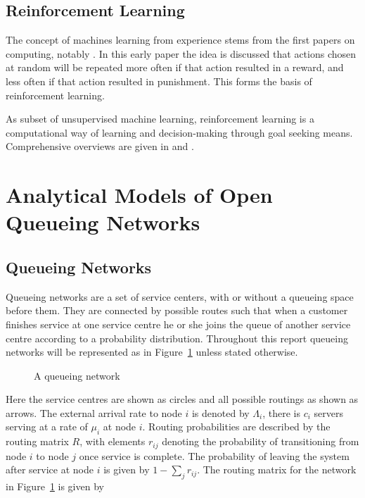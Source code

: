 \documentclass{article}
\begin{document}
\subsection{Reinforcement Learning}
The concept of machines learning from experience stems from the first papers on computing, notably \cite{turing50}.
In this early paper the idea is discussed that actions chosen at random will be repeated more often if that action resulted in a reward, and less often if that action resulted in punishment.
This forms the basis of reinforcement learning.

As subset of unsupervised machine learning, reinforcement learning is a computational way of learning and decision-making through goal seeking means.
Comprehensive overviews are given in \cite{suttonbarto98} and \cite{szepesvari10}.




\section{Analytical Models of Open Queueing Networks}
\subsection {Queueing Networks}
Queueing networks are a set of service centers, with or without a queueing space before them.
They are connected by possible routes such that when a customer finishes service at one service centre he or she joins the queue of another service centre according to a probability distribution.
Throughout this report queueing networks will be represented as in Figure~\ref{fig:QnetNotation} unless stated otherwise.

\begin{figure}[H]
    
    \caption{A queueing network}
    \label{fig:QnetNotation}
\end{figure}

Here the service centres are shown as circles and all possible routings as shown as arrows.
The external arrival rate to node $i$ is denoted by $\Lambda_i$, there is $c_i$ servers serving at a rate of $\mu_i$ at node $i$.
Routing probabilities are described by the routing matrix $R$, with elements $r_{ij}$ denoting the probability of transitioning from node $i$ to node $j$ once service is complete.
The probability of leaving the system after service at node $i$ is given by $1 - \sum_j r_{ij}$.
The routing matrix for the network in Figure~\ref{fig:QnetNotation} is given by
\end{document}
